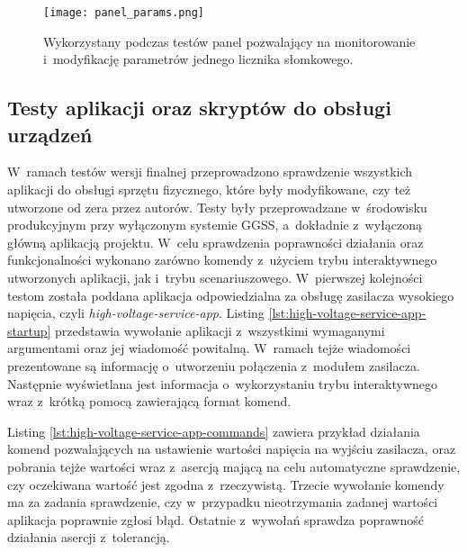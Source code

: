 \clearpage
\begin{figure}[H]
    \centering
    \texttt{[image: panel\_params.png]}
    \caption{Wykorzystany podczas testów panel pozwalający na monitorowanie i~modyfikację parametrów jednego licznika słomkowego.}
    \label{fig:panel-params}
\end{figure}


\subsection{Testy aplikacji oraz skryptów do obsługi urządzeń}

W~ramach testów wersji finalnej przeprowadzono sprawdzenie wszystkich aplikacji do obsługi sprzętu fizycznego, które były modyfikowane, czy też utworzone od zera przez autorów. Testy były przeprowadzane w~środowisku produkcyjnym przy wyłączonym systemie GGSS, a~dokładnie z~wyłączoną główną aplikacją projektu. W~celu sprawdzenia poprawności działania oraz funkcjonalności wykonano zarówno komendy z~użyciem trybu interaktywnego utworzonych aplikacji, jak i~trybu scenariuszowego. W~pierwszej kolejności testom została poddana aplikacja odpowiedzialna za obsługę zasilacza wysokiego napięcia, czyli \emph{high-voltage-service-app}. Listing \ref{lst:high-voltage-service-app-startup} przedstawia wywołanie aplikacji z~wszystkimi wymaganymi argumentami oraz jej wiadomość powitalną. W~ramach tejże wiadomości prezentowane są informację o~utworzeniu połączenia z~modułem zasilacza. Następnie wyświetlana jest informacja o~wykorzystaniu trybu interaktywnego wraz z~krótką pomocą zawierającą format komend.

\clearpage


Listing \ref{lst:high-voltage-service-app-commands} zawiera przykład działania komend pozwalających na ustawienie wartości napięcia na wyjściu zasilacza, oraz pobrania tejże wartości wraz z~asercją mającą na celu automatyczne sprawdzenie, czy oczekiwana wartość jest zgodna z~rzeczywistą. Trzecie wywołanie komendy ma za zadania sprawdzenie, czy w~przypadku nieotrzymania zadanej wartości aplikacja poprawnie zgłosi błąd. Ostatnie z~wywołań sprawdza poprawność działania asercji z~tolerancją.



